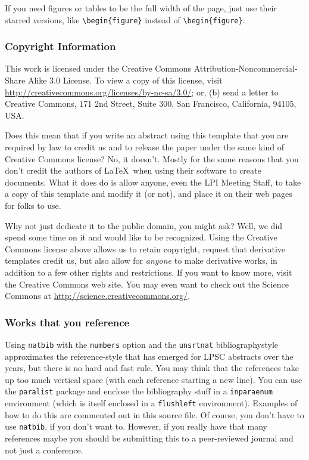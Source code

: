 \documentclass[twoside]{article}
\begin{document}
If you need figures or tables to be the full width of the page,
just use their starred versions, like \verb=\begin{figure}= instead
of \verb=\begin{figure}=.

\subsubsection*{Copyright Information}

This work is licensed under the Creative Commons
Attribution-Noncommercial-Share Alike 3.0 License. To view a copy
of this license, visit \url{http://creativecommons.org/licenses/by-nc-sa/3.0/};
or, (b) send a letter to Creative Commons, 171 2nd Street, Suite
300, San Francisco, California, 94105, USA.

Does this mean that if you write an abstract using this template that
you are required by law to credit us and to release the paper under
the same kind of Creative Commons license?  No, it doesn't.  Mostly
for the same reasons that you don't credit the authors of \LaTeX\
when using their software to create documents.  What it does do is allow
anyone, even the LPI Meeting Staff, to take a copy of this template
and modify it (or not), and place it on their web pages for folks
to use.

Why not just dedicate it to the public domain, you might ask?  Well,
we did spend some time on it and would like to be recognized.  Using
the Creative Commons license above allows us to retain copyright,
request that derivative templates credit us, but also allow for
\emph{anyone} to make derivative works, in addition to a few other
rights and restrictions.  If you want to know more, visit the
Creative Commons web site.  You may even want to check out the
Science Commons at \url{http://science.creativecommons.org/}.


\subsubsection*{Works that you reference}

Using \texttt{natbib} with the \texttt{numbers} option and the
\texttt{unsrtnat} bibliographystyle approximates the reference-style
that has emerged for LPSC abstracts over the years, but there is
no hard and fast rule.  You may think that the references take up
too much vertical space (with each reference starting a new line).
You can use the \texttt{paralist} package and enclose the bibliography
stuff in a \texttt{inparaenum} environment (which is itself enclosed
in a \texttt{flushleft} environment).  Examples of how to do this
are commented out in this source file.  Of course, you don't have to 
use \texttt{natbib}, if you don't want to.  However, if you really have
that many references maybe you should be submitting this to a
peer-reviewed journal and not just a conference.



\end{document}
